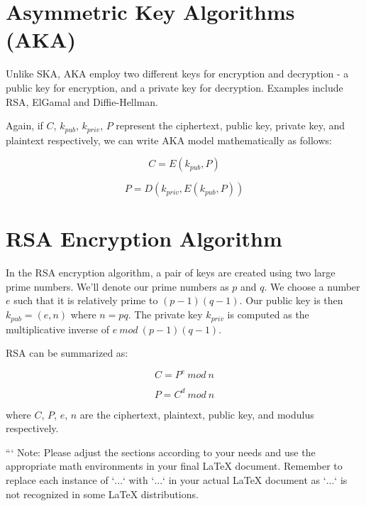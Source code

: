 \section{Asymmetric Key Algorithms (AKA)}

Unlike SKA, AKA employ two different keys for encryption and decryption - a public key for encryption, and a private key for decryption. Examples include RSA, ElGamal and Diffie-Hellman.

Again, if $C$, ${k}_{pub}$, ${k}_{priv}$, $P$ represent the ciphertext, public key, private key, and plaintext respectively, we can write AKA model mathematically as follows:

\begin{equation}
C = E({k}_{pub}, P)
\end{equation}

\begin{equation}
P = D({k}_{priv}, E({k}_{pub}, P))
\end{equation}

\section{RSA Encryption Algorithm}

In the RSA encryption algorithm, a pair of keys are created using two large prime numbers. We'll denote our prime numbers as $p$ and $q$. We choose a number $e$ such that it is relatively prime to $(p-1)(q-1)$. Our public key is then $k_{pub} = (e, n)$ where $n=pq$. The private key $k_{priv}$ is computed as the multiplicative inverse of $e\ mod\ (p-1)(q-1)$. 

RSA can be summarized as:

\begin{equation}
C = P^e\ mod\ n
\end{equation}

\begin{equation}
P = C^d\ mod\ n
\end{equation}

where $C$, $P$, $e$, $n$ are the ciphertext, plaintext, public key, and modulus respectively.


```
Note: Please adjust the sections according to your needs and use the appropriate math environments in your final LaTeX document. Remember to replace each instance of `\( ... \)` with `$...$` in your actual LaTeX document as `\(...\)` is not recognized in some LaTeX distributions.

